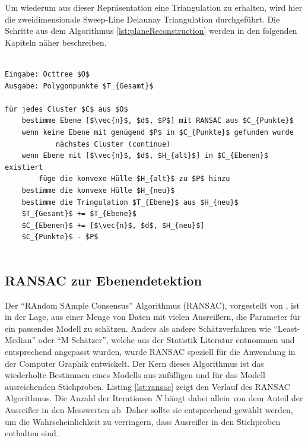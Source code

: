 Um wiederum aus dieser Repräsentation eine Triangulation zu erhalten, wird hier die zweidimensionale Sweep-Line Delaunay Triangulation durchgeführt. Die Schritte aus dem Algorithmus \ref{lst:planeReconstruction} werden in den folgenden Kapiteln näher beschreiben.

\begin{lstlisting}[mathescape,caption=Planaren Echtzeit Rekonstruktion, label=lst:planeReconstruction]

Eingabe: Octtree $O$
Ausgabe: Polygonpunkte $T_{Gesamt}$

für jedes Cluster $C$ aus $O$
    bestimme Ebene [$\vec{n}$, $d$, $P$] mit RANSAC aus $C_{Punkte}$
    wenn keine Ebene mit genügend $P$ in $C_{Punkte}$ gefunden wurde
    		nächstes Cluster (continue)
    wenn Ebene mit [$\vec{n}$, $d$, $H_{alt}$] in $C_{Ebenen}$ existiert	
        füge die konvexe Hülle $H_{alt}$ zu $P$ hinzu	
    bestimme die konvexe Hülle $H_{neu}$
    bestimme die Tringulation $T_{Ebene}$ aus $H_{neu}$
    $T_{Gesamt}$ += $T_{Ebene}$
    $C_{Ebenen}$ += [$\vec{n}$, $d$, $H_{neu}$]
    $C_{Punkte}$ - $P$
		

\end{lstlisting}

\subsection{RANSAC zur Ebenendetektion}

Der \enquote{RAndom SAmple Consensus} Algorithmus (RANSAC), vorgestellt von \citet{fischler1981random}, ist in der Lage, aus einer Menge von Daten mit vielen Ausreißern, die Parameter für ein passendes Modell zu schätzen. Anders als andere Schätzverfahren wie \enquote{Least-Median} oder \enquote{M-Schätzer}, welche aus der Statistik Literatur entnommen und entsprechend angepasst wurden, wurde RANSAC speziell für die Anwendung in der Computer Graphik entwickelt. Der Kern dieses Algorithmus ist das wiederholte Bestimmen eines Modells aus zufälligen und für das Modell ausreichenden Stichproben. Listing \ref{lst:ransac} zeigt den Verlauf des RANSAC Algorithmus. Die Anzahl der Iterationen \(N\) hängt dabei allein von dem Anteil der Ausreißer in den Messwerten ab. Daher sollte sie entsprechend gewählt werden, um die Wahrscheinlichkeit zu verringern, dass Ausreißer in den Stichproben enthalten sind. \citep{derpanis2010overview} \\

